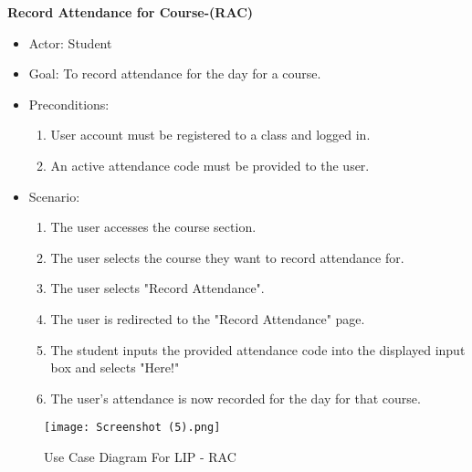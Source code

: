 \documentclass[letterpaper,12pt,oneside,listof=totoc]{scrreprt}
\begin{document}
\hfill \break
\textbf{Record Attendance for Course-(RAC)}
\begin{itemize}
    \item Actor: Student
    \item Goal: To record attendance for the day for a course.
    \item Preconditions:
    \begin{enumerate}
        \item User account must be registered to a class and logged in.
        \item An active attendance code must be provided to the user.
    \end{enumerate}
    \item Scenario:
    \begin{enumerate}
        \item The user accesses the course section.
        \item The user selects the course they want to record attendance for.
        \item The user selects "Record Attendance".
        \item The user is redirected to the "Record Attendance" page.
        \item The student inputs the provided attendance code into the displayed input box and selects "Here!"
        \item The user's attendance is now recorded for the day for that course.
    \end{enumerate}
\end{itemize}

\clearpage

\begin{figure}[htbp]
    \centering
    \texttt{[image: Screenshot (5).png]}
    \caption{Use Case Diagram For LIP - RAC}
    \label{fig:LIP-RAC}
\end{figure}

\clearpage
\end{document}
